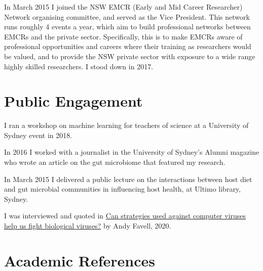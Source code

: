 \documentclass[a4paper]{article}
\begin{document}
In March 2015 I joined the NSW EMCR (Early and Mid Career Researcher) Network organising committee, and served as the Vice President. This network runs roughly 4 events a year, which aim to build professional networks between EMCRs and the private sector. Specifically, this is to make EMCRs aware of professional opportunities and careers where their training as researchers would be valued, and to provide the NSW private sector with exposure to a wide range highly skilled researchers. I stood down in 2017.


\section*{Public Engagement}

I ran a workshop on machine learning for teachers of science at a University of Sydney event in 2018.

In 2016 I worked with a journalist in the University of Sydney's Alumni magazine who wrote an article on the gut microbiome that featured my research.

In March 2015 I delivered a public lecture on the interactions between host diet and gut microbial communities in influencing host health, at Ultimo library, Sydney.


I was interviewed and quoted in \href{https://www.welcometothejungle.com/en/articles/btc-computer-biological-virus}{Can strategies used against computer viruses help us fight biological viruses?} by Andy Favell, 2020.


\section*{Academic References}
\end{document}
